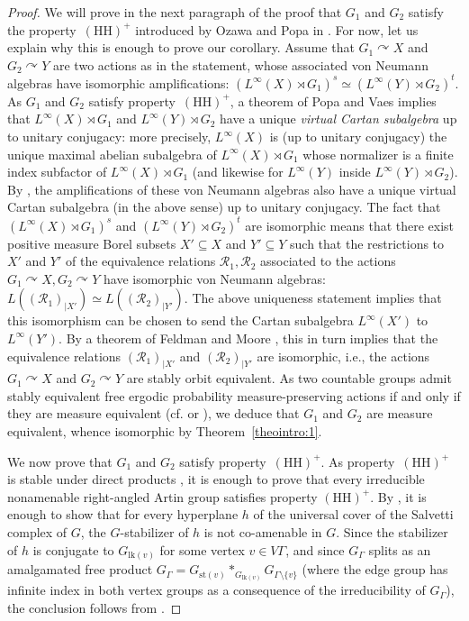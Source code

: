 \documentclass[11pt]{article}
\newcommand{\ie}{i.e.,\xspace}
\newcommand{\cf}{cf.\xspace}
\numberwithin{equation}{section}
\let\mathcal\mathscr
\theoremstyle{plain}
\theoremstyle{definition}
\let\actson\curvearrowright
\newcommand{\lk}{\mathrm{lk}}
\newcommand{\st}{\mathrm{st}}
\begin{document}
\begin{proof}
We will prove in the next paragraph of the proof that $G_1$ and $G_2$ satisfy the property~$\mathrm{(HH)}^+$ introduced by Ozawa and Popa in \cite[Def.\,1]{OP}. For now, let us explain why this is enough to prove our corollary. Assume that $G_1\actson X$ and $G_2\actson Y$ are two actions as in the statement, whose associated von Neumann algebras have isomorphic amplifications: $(L^\infty(X)\rtimes G_1)^s\simeq (L^\infty(Y)\rtimes G_2)^t$. As $G_1$ and $G_2$ satisfy property~$\mathrm{(HH)}^+$, a theorem of Popa and Vaes \cite[Th.\,1.2 and Remark~1.3]{PV1} implies that $L^\infty(X)\rtimes G_1$ and $L^\infty(Y)\rtimes G_2$ have a unique \emph{virtual Cartan subalgebra} up to unitary conjugacy: more precisely, $L^{\infty}(X)$ is (up to unitary conjugacy) the unique maximal abelian subalgebra of $L^\infty(X)\rtimes G_1$ whose normalizer is a finite index subfactor of $L^\infty(X)\rtimes G_1$ (and likewise for $L^\infty(Y)$ inside $L^\infty(Y)\rtimes G_2$). By \cite[Prop.\,4.12]{OP1}, the amplifications of these von Neumann algebras also have a unique virtual Cartan subalgebra (in the above sense) up to unitary conjugacy. The fact that $(L^\infty(X)\rtimes G_1)^s$ and $(L^\infty(Y)\rtimes G_2)^t$ are isomorphic means that there exist positive measure Borel subsets $X'\subseteq X$ and $Y'\subseteq Y$ such that the restrictions to $X'$ and $Y'$ of the equivalence relations $\mathcal{R}_1,\mathcal{R}_2$ associated to the actions $G_1\actson X,G_2\actson Y$ have isomorphic von Neumann algebras: $L((\mathcal{R}_1)_{|X'})\simeq L((\mathcal{R}_2)_{|Y'})$. The above uniqueness statement implies that this isomorphism can be chosen to send the Cartan subalgebra $L^\infty(X')$ to $L^\infty(Y')$. By a theorem of Feldman and Moore \cite{FM}, this in turn implies that the equivalence relations $(\mathcal{R}_1)_{|X'}$ and $(\mathcal{R}_2)_{|Y'}$ are isomorphic, \ie the actions $G_1\actson X$ and $G_2\actson Y$ are stably orbit equivalent. As two countable groups admit stably equivalent free ergodic probability measure-preserving actions if and only if they are measure equivalent (\cf \cite[Th.\,3.3]{Fur2} or \cite[Th.\,2.3]{Gab2}), we deduce that $G_1$ and $G_2$ are measure equivalent, whence isomorphic by Theorem~\ref{theointro:1}.

We now prove that $G_1$ and $G_2$ satisfy property~$\mathrm{(HH)}^+$. As property~$\mathrm{(HH)}^+$ is stable under direct products \cite[Th.\,2.3(2)]{OP}, it is enough to prove that every irreducible nonamenable right-angled Artin group satisfies property $\mathrm{(HH)}^+$. By \cite[Th.\,2.3(5)]{OP}, it is enough to show that for every hyperplane $h$ of the universal cover of the Salvetti complex of $G$, the $G$-stabilizer of $h$ is not co-amenable in $G$. Since the stabilizer of $h$ is conjugate to $G_{\lk(v)}$ for some vertex $v\in V\Gamma$, and since $G_\Gamma$ splits as an amalgamated free product $G_\Gamma=G_{\st(v)}\ast_{G_{\lk(v)}}G_{\Gamma\setminus\{v\}}$ (where the edge group has infinite index in both vertex groups as a consequence of the irreducibility of $G_\Gamma$), the conclusion follows from \cite[Lem.\,2.4]{CE}.
\end{proof}
\end{document}
